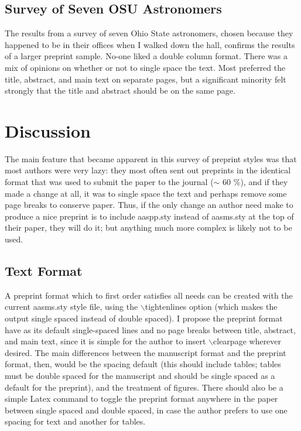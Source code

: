 \subsection{Survey of Seven OSU Astronomers}

The results from a survey of seven Ohio State astronomers, chosen because 
they happened to be in their offices when I walked down the hall, confirms 
the results of a larger preprint sample.  No-one liked a double column format.
There was a mix of opinions on whether or not to single space the text.
Most preferred the title, abstract, and main text on separate pages, but a 
significant minority felt strongly that the title and abstract should be 
on the same page.

\section
{Discussion}

The main feature that became apparent in this survey of preprint styles 
was that most authors were very lazy: they most often sent out preprints 
in the identical format that was used to submit the paper to the journal 
($\sim$ 60 \%), and if they made a change at all, it was to single space 
the text and perhaps remove some page breaks to conserve paper.  Thus, if 
the only change an author need make to produce a nice preprint is to include 
aaspp.sty instead of aasms.sty at the top of their paper, they will do it; 
but anything much more complex is likely not to be used.

\subsection{Text Format}

A preprint format which to first order satisfies all needs can be created 
with the current aasms.sty style file, using the $\backslash$tightenlines 
option (which makes the output single spaced instead of double spaced).
I propose the preprint format have as its default single-spaced lines and 
no page breaks between title, abstract, and main text, since it is simple 
for the author to insert $\backslash$clearpage wherever desired.  The main 
differences between the manuscript format and the preprint format, then, 
would be the spacing default (this should include tables; tables must be 
double spaced for the manuscript and should be single spaced as a default 
for the preprint), and the treatment of figures.  There should also be a 
simple Latex command to toggle the preprint format anywhere in the paper
between single spaced and double spaced, in case the author prefers to use 
one spacing for text and another for tables.

